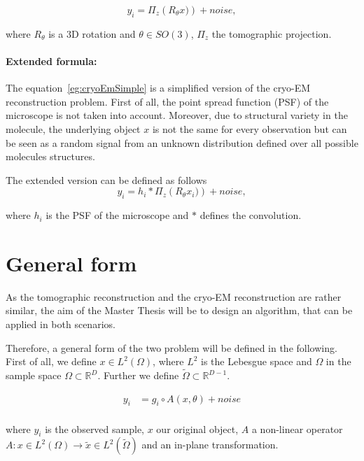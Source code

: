 \begin{equation}
    \label{eg:cryoEmSimple}
    y_i = \Pi_z \left( R_{\theta} x) \right) + noise,
\end{equation}

where $R_{\theta}$ is a 3D rotation and $\theta \in SO(3)$, $\Pi_z$ the tomographic projection.

\paragraph{Extended formula:} 
The equation~\ref{eg:cryoEmSimple} is a simplified version of the cryo-EM reconstruction problem.
First of all, the point spread function (PSF) of the microscope is not taken into account.
Moreover, due to structural variety in the molecule, the underlying object $x$ is not the same 
for every observation but can be seen as a random signal from an unknown distribution defined over all possible molecules structures.

The extended version can be defined as follows
\begin{equation}
    \label{eg:cryoEmExtended}
    y_i = h_i * \Pi_z \left( R_{\theta} x_i) \right) + noise,
\end{equation}

where $h_i$ is the PSF of the microscope and $*$ defines the convolution.


\section{General form}

As the tomographic reconstruction and the cryo-EM reconstruction are rather similar, 
the aim of the Master Thesis will be to design an algorithm, that can be applied in both scenarios.

Therefore, a general form of the two problem will be defined in the following.
First of all, we define $x \in L^2(\Omega)$, where $L^2$ is the Lebesgue space and $\Omega$
in the sample space $\Omega \subset \mathbb{R}^D$. Further we define $\tilde{\Omega} \subset \mathbb{R}^{D-1}$.


\begin{equation}
    \begin{aligned}
        y_i &= g_i \circ A(x, \theta) + noise \\
    \end{aligned}
\end{equation}

where $y_i$ is the observed sample, $x$ our original object, $A$ a non-linear operator 
$A: x \in L^2(\Omega) \rightarrow \tilde{x} \in L^2(\tilde{\Omega})$
and an in-plane transformation.


